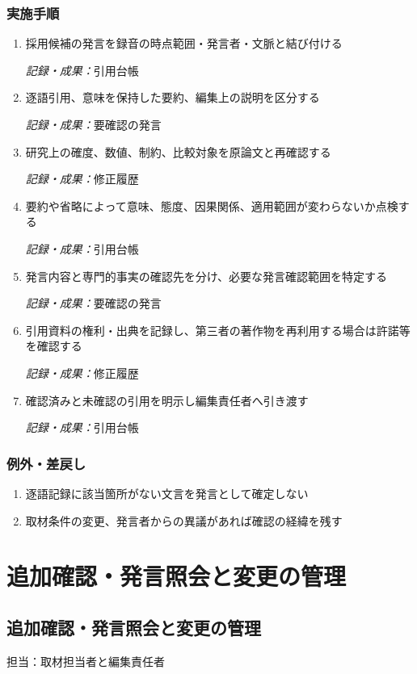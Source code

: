 \documentclass[a4paper,11pt]{article}
\begin{document}
\subsubsection*{実施手順}
\begin{enumerate}[leftmargin=2em,itemsep=0.65em]
\item 採用候補の発言を録音の時点範囲・発言者・文脈と結び付ける\par\noindent\textit{記録・成果：}引用台帳\nobreak\smallskip
\item 逐語引用、意味を保持した要約、編集上の説明を区分する\par\noindent\textit{記録・成果：}要確認の発言\nobreak\smallskip
\item 研究上の確度、数値、制約、比較対象を原論文と再確認する\par\noindent\textit{記録・成果：}修正履歴\nobreak\smallskip
\item 要約や省略によって意味、態度、因果関係、適用範囲が変わらないか点検する\par\noindent\textit{記録・成果：}引用台帳\nobreak\smallskip
\item 発言内容と専門的事実の確認先を分け、必要な発言確認範囲を特定する\par\noindent\textit{記録・成果：}要確認の発言\nobreak\smallskip
\item 引用資料の権利・出典を記録し、第三者の著作物を再利用する場合は許諾等を確認する\par\noindent\textit{記録・成果：}修正履歴\nobreak\smallskip
\item 確認済みと未確認の引用を明示し編集責任者へ引き渡す\par\noindent\textit{記録・成果：}引用台帳\nobreak\smallskip
\end{enumerate}
\subsubsection*{例外・差戻し}
\begin{enumerate}[leftmargin=2em,itemsep=0.35em]
\item 逐語記録に該当箇所がない文言を発言として確定しない
\item 取材条件の変更、発言者からの異議があれば確認の経緯を残す
\end{enumerate}
\section{追加確認・発言照会と変更の管理}
\subsection{追加確認・発言照会と変更の管理}
\par 担当：取材担当者と編集責任者\par\medskip
\end{document}
